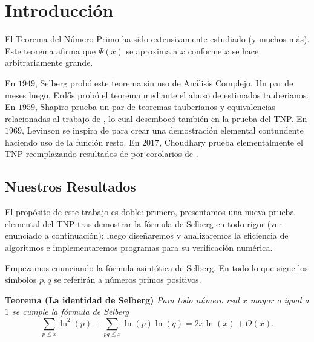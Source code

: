 \setlength{\headheight}{14.61858pt}
\pagestyle{fancy}

\chapter[Introducci\'on]
{Introducci\'on}
\label{ch:introduction}

\vspace*{1cm}

El Teorema del N\'umero Primo ha sido extensivamente estudiado
\cite{
  Breusch1960,
  Choudhary2017,
  Diamond1982,
  Erdos1949,
  Levinson1969,
  Liu2022,
  Newman1980,
  Pan2023,
  Richter2021,
  Selberg1949,
  Shapiro1959}
(y muchos m\'as).
Este teorema afirma que \(\Psi(x)\) se aproxima a \(x\)
conforme \(x\) se hace arbitrariamente grande.

En \(1949\), Selberg \cite{Selberg1949}
prob\'o este teorema sin uso de An\'alisis Complejo.
Un par de meses luego, Erdős \cite{Erdos1949}
prob\'o el teorema mediante el abuso de estimados tauberianos.
En \(1959\), Shapiro \cite{Shapiro1959}
prueba un par de teoremas tauberianos y equivalencias relacionadas
al trabajo de \cite{Erdos1949},
lo cual desemboc\'o tambi\'en en la prueba del TNP.
En \(1969\), Levinson \cite{Levinson1969} se inspira de \cite{Selberg1949, Breusch1960}
para crear una demostraci\'on elemental contundente haciendo uso de la funci\'on resto.
En \(2017\), Choudhary \cite{Choudhary2017} prueba elementalmente el TNP
reemplazando resultados de \cite{Levinson1969}
por corolarios de \cite{Shapiro1959}.

\section{Nuestros Resultados}
El prop\'osito de este trabajo es doble:
primero, presentamos una nueva prueba elemental del TNP
tras demostrar la f\'ormula de Selberg en todo rigor
(ver enunciado a continuaci\'on);
luego diseñaremos y analizaremos la eficiencia de algoritmos e
implementaremos programas para su verificaci\'on num\'erica.

\bigskip

Empezamos enunciando la f\'ormula asint\'otica de Selberg. 
En todo lo que sigue los s\'imbolos \(p, q\) se referir\'an a
n\'umeros primos positivos.

\bigskip

\noindent
\textbf{Teorema (La identidad de Selberg)}
\textit{Para todo n\'umero real \(x\) mayor o igual a \(1\)
se cumple la f\'ormula de Selberg}
\[
  \sum_{p \leq x} \ln^2(p) + \sum_{pq \leq x} \ln(p) \ln(q) = 2x\ln(x) + O(x).
\]

